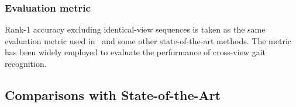 \documentclass[runningheads]{llncs}
\begin{document}
\subsubsection{Evaluation metric} Rank-1 accuracy excluding identical-view sequences is taken as the same evaluation metric used in~\cite{aaai2019gaitset} and some other state-of-the-art methods. The metric has been widely employed to evaluate the performance of cross-view gait recognition. 



\subsection{Comparisons with State-of-the-Art}


\begin{table}[ht]
  \scriptsize
  \centering
   \caption{Rank-1 accuracy (\%) on CASIA-B under all view angles, different settings, and conditions, excluding identical-view cases.
}
  \vspace*{-1em}
    \label{tab:casiab}
\end{table}
\end{document}
